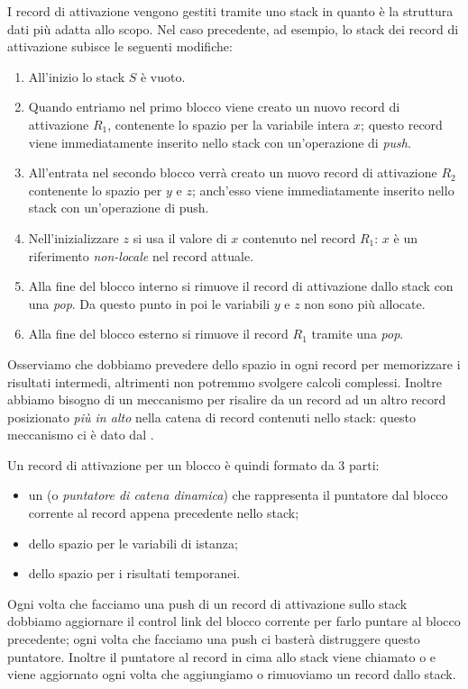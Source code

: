 I record di attivazione vengono gestiti tramite uno stack in quanto è la struttura dati più adatta allo scopo. Nel caso precedente, ad esempio, lo stack dei record di attivazione subisce le seguenti modifiche:
\begin{enumerate}
    \item All'inizio lo stack $S$ è vuoto.
    \item Quando entriamo nel primo blocco viene creato un nuovo record di attivazione $R_1$, contenente lo spazio per la variabile intera $x$; questo record viene immediatamente inserito nello stack con un'operazione di \emph{push}.
    \item All'entrata nel secondo blocco verrà creato un nuovo record di attivazione $R_2$ contenente lo spazio per $y$ e $z$; anch'esso viene immediatamente inserito nello stack con un'operazione di push.
    \item Nell'inizializzare $z$ si usa il valore di $x$ contenuto nel record $R_1$: $x$ è un riferimento \emph{non-locale} nel record attuale.
    \item Alla fine del blocco interno si rimuove il record di attivazione dallo stack con una \emph{pop}. Da questo punto in poi le variabili $y$ e $z$ non sono più allocate.
    \item Alla fine del blocco esterno si rimuove il record $R_1$ tramite una \emph{pop}.
\end{enumerate}

Osserviamo che dobbiamo prevedere dello spazio in ogni record per memorizzare i risultati intermedi, altrimenti non potremmo svolgere calcoli complessi.
Inoltre abbiamo bisogno di un meccanismo per risalire da un record ad un altro record posizionato \emph{più in alto} nella catena di record contenuti nello stack: questo meccanismo ci è dato dal .

Un record di attivazione per un blocco è quindi formato da $3$ parti:
\begin{itemize}
    \item un  (o \emph{puntatore di catena dinamica}) che rappresenta il puntatore dal blocco corrente al record appena precedente nello stack;
    \item dello spazio per le variabili di istanza;
    \item dello spazio per i risultati temporanei.
\end{itemize}
Ogni volta che facciamo una push di un record di attivazione sullo stack dobbiamo aggiornare il control link del blocco corrente per farlo puntare al blocco precedente; ogni volta che facciamo una push ci basterà distruggere questo puntatore. Inoltre il puntatore al record in cima allo stack viene chiamato  o  e viene aggiornato ogni volta che aggiungiamo o rimuoviamo un record dallo stack.

